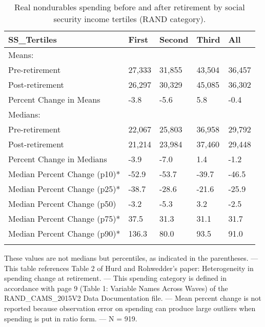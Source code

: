 \begin{table}[tbp] \centering
{}

\caption{Real nondurables spending before and after retirement by social security income tertiles (RAND category).}
\begin{tabularx}{\textwidth}{lCCCC}

\toprule
{SS\_Tertiles}&{First}&{Second}&{Third}&{All} \tabularnewline
\midrule\addlinespace[1.5ex]
Means:&&&& \tabularnewline
\midrule Pre-retirement&27,333&31,855&43,504&36,457 \tabularnewline
Post-retirement&26,297&30,329&45,085&36,302 \tabularnewline
Percent Change in Means&-3.8&-5.6&5.8&-0.4 \tabularnewline
\midrule Medians:&&&& \tabularnewline
\midrule Pre-retirement&22,067&25,803&36,958&29,792 \tabularnewline
Post-retirement&21,214&23,984&37,460&29,448 \tabularnewline
Percent Change in Medians&-3.9&-7.0&1.4&-1.2 \tabularnewline
Median Percent Change (p10)*&-52.9&-53.7&-39.7&-46.5 \tabularnewline
Median Percent Change (p25)*&-38.7&-28.6&-21.6&-25.9 \tabularnewline
Median Percent Change (p50)&-3.2&-5.3&3.2&-2.5 \tabularnewline
Median Percent Change (p75)*&37.5&31.3&31.1&31.7 \tabularnewline
Median Percent Change (p90)*&136.3&80.0&93.5&91.0 \tabularnewline
\bottomrule \addlinespace[1.5ex]

\end{tabularx}
\begin{flushleft}
\footnotesize *These values are not medians but percentiles, as indicated in the parentheses. \linebreak --- \linebreak This table references Table 2 of Hurd and Rohwedder's paper: Heterogeneity in spending change at retirement. \linebreak --- \linebreak This spending category is defined in accordance with page 9 (Table 1: Variable Names Across Waves) of the RAND\_CAMS\_2015V2 Data Documentation file. \linebreak --- \linebreak Mean percent change is not reported because observation error on spending can produce large outliers when spending is put in ratio form. \linebreak --- \linebreak N = 919.
\end{flushleft}
\end{table}
